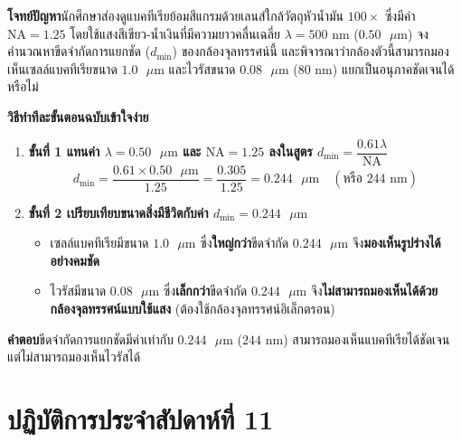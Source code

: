\begin{worked}
\textbf{โจทย์ปัญหา}\quad นักศึกษาส่องดูแบคทีเรียย้อมสีแกรมด้วยเลนส์ใกล้วัตถุหัวน้ำมัน $100\times$ ซึ่งมีค่า $\text{NA} = 1.25$ โดยใช้แสงสีเขียว-น้ำเงินที่มีความยาวคลื่นเฉลี่ย $\lambda = 500\text{ nm}$ ($0.50\text{ }\mu\text{m}$) จงคำนวณหาขีดจำกัดการแยกชัด ($d_{\min}$) ของกล้องจุลทรรศน์นี้ และพิจารณาว่ากล้องตัวนี้สามารถมองเห็นเซลล์แบคทีเรียขนาด $1.0\text{ }\mu\text{m}$ และไวรัสขนาด $0.08\text{ }\mu\text{m}$ ($80\text{ nm}$) แยกเป็นอนุภาคชัดเจนได้หรือไม่

\textbf{วิธีทำทีละขั้นตอนฉบับเข้าใจง่าย}
\begin{enumerate}
    \item \textbf{ขั้นที่ 1 แทนค่า $\lambda = 0.50\text{ }\mu\text{m}$ และ $\text{NA} = 1.25$ ลงในสูตร $d_{\min} = \dfrac{0.61\lambda}{\text{NA}}$}
    \[
        d_{\min} = \frac{0.61 \times 0.50\text{ }\mu\text{m}}{1.25} = \frac{0.305}{1.25} = 0.244\text{ }\mu\text{m} \quad (\text{หรือ } 244\text{ nm})
    \]
    \item \textbf{ขั้นที่ 2 เปรียบเทียบขนาดสิ่งมีชีวิตกับค่า $d_{\min} = 0.244\text{ }\mu\text{m}$}
    \begin{itemize}
        \item เซลล์แบคทีเรียมีขนาด $1.0\text{ }\mu\text{m}$ ซึ่ง\textbf{ใหญ่กว่า}ขีดจำกัด $0.244\text{ }\mu\text{m}$ จึง\textbf{มองเห็นรูปร่างได้อย่างคมชัด}
        \item ไวรัสมีขนาด $0.08\text{ }\mu\text{m}$ ซึ่ง\textbf{เล็กกว่า}ขีดจำกัด $0.244\text{ }\mu\text{m}$ จึง\textbf{ไม่สามารถมองเห็นได้ด้วยกล้องจุลทรรศน์แบบใช้แสง} (ต้องใช้กล้องจุลทรรศน์อิเล็กตรอน)
    \end{itemize}
\end{enumerate}
\textbf{คำตอบ}\quad ขีดจำกัดการแยกชัดมีค่าเท่ากับ $0.244\text{ }\mu\text{m}$ ($244\text{ nm}$) สามารถมองเห็นแบคทีเรียได้ชัดเจน แต่ไม่สามารถมองเห็นไวรัสได้
\end{worked}

\section{ปฏิบัติการประจำสัปดาห์ที่ 11}


